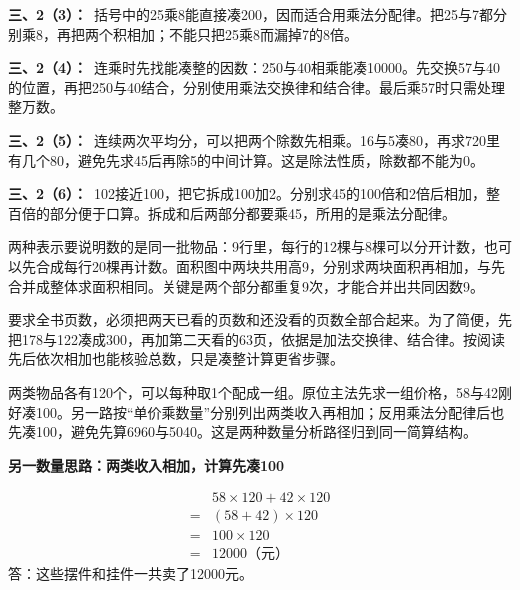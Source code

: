 \documentclass[multi=snippet,border=0pt]{standalone}
\newenvironment{snippet}[3]{\begin{minipage}{#1bp}\color{answerred}\fontsize{#2}{#3}\selectfont\raggedright}{\end{minipage}}
\begin{document}
\begin{snippet}{505}{11.5}{14}\textbf{三、2（3）：}\ 括号中的25乘8能直接凑200，因而适合用乘法分配律。把25与7都分别乘8，再把两个积相加；不能只把25乘8而漏掉7的8倍。\end{snippet}
\begin{snippet}{505}{11.5}{14}\textbf{三、2（4）：}\ 连乘时先找能凑整的因数：250与40相乘能凑10000。先交换57与40的位置，再把250与40结合，分别使用乘法交换律和结合律。最后乘57时只需处理整万数。\end{snippet}
\begin{snippet}{505}{11.5}{14}\textbf{三、2（5）：}\ 连续两次平均分，可以把两个除数先相乘。16与5凑80，再求720里有几个80，避免先求45后再除5的中间计算。这是除法性质，除数都不能为0。\end{snippet}
\begin{snippet}{505}{11.5}{14}\textbf{三、2（6）：}\ 102接近100，把它拆成100加2。分别求45的100倍和2倍后相加，整百倍的部分便于口算。拆成和后两部分都要乘45，所用的是乘法分配律。\end{snippet}
\begin{snippet}{505}{11.5}{14}两种表示要说明数的是同一批物品：9行里，每行的12棵与8棵可以分开计数，也可以先合成每行20棵再计数。面积图中两块共用高9，分别求两块面积再相加，与先合并成整体求面积相同。关键是两个部分都重复9次，才能合并出共同因数9。\end{snippet}
\begin{snippet}{505}{11.5}{14}要求全书页数，必须把两天已看的页数和还没看的页数全部合起来。为了简便，先把178与122凑成300，再加第二天看的63页，依据是加法交换律、结合律。按阅读先后依次相加也能核验总数，只是凑整计算更省步骤。\end{snippet}
\begin{snippet}{505}{11.5}{14}两类物品各有120个，可以每种取1个配成一组。原位主法先求一组价格，58与42刚好凑100。另一路按“单价乘数量”分别列出两类收入再相加；反用乘法分配律后也先凑100，避免先算6960与5040。这是两种数量分析路径归到同一简算结构。\par \textbf{另一数量思路：两类收入相加，计算先凑100}\par \[\begin{aligned}&58\times120+42\times120\\={}&(58+42)\times120\\={}&100\times120\\={}&12000\text{（元）}\end{aligned}\]答：这些摆件和挂件一共卖了12000元。\end{snippet}
\end{document}

